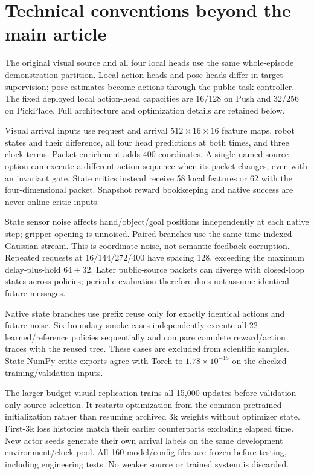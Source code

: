 \section{Technical conventions beyond the main article}
The original visual source and all four local heads use the same whole-episode demonstration partition. Local action heads and pose heads differ in target supervision; pose estimates become actions through the public task controller. The fixed deployed local action-head capacities are 16/128 on Push and 32/256 on PickPlace. Full architecture and optimization details are retained below.

Visual arrival inputs use request and arrival $512\times16\times16$ feature maps, robot states and their difference, all four head predictions at both times, and three clock terms. Packet enrichment adds 400 coordinates. A single named source option can execute a different action sequence when its packet changes, even with an invariant gate. State critics instead receive 58 local features or 62 with the four-dimensional packet. Snapshot reward bookkeeping and native success are never online critic inputs.

State sensor noise affects hand/object/goal positions independently at each native step; gripper opening is unnoised. Paired branches use the same time-indexed Gaussian stream. This is coordinate noise, not semantic feedback corruption. Repeated requests at 16/144/272/400 have spacing 128, exceeding the maximum delay-plus-hold $64+32$. Later public-source packets can diverge with closed-loop states across policies; periodic evaluation therefore does not assume identical future messages.

Native state branches use prefix reuse only for exactly identical actions and future noise. Six boundary smoke cases independently execute all 22 learned/reference policies sequentially and compare complete reward/action traces with the reused tree. These cases are excluded from scientific samples. State NumPy critic exports agree with Torch to $1.78\times10^{-15}$ on the checked training/validation inputs.

The larger-budget visual replication trains all 15,000 updates before validation-only source selection. It restarts optimization from the common pretrained initialization rather than resuming archived 3k weights without optimizer state. First-3k loss histories match their earlier counterparts excluding elapsed time. New actor seeds generate their own arrival labels on the same development environment/clock pool. All 160 model/config files are frozen before testing, including engineering tests. No weaker source or trained system is discarded.

